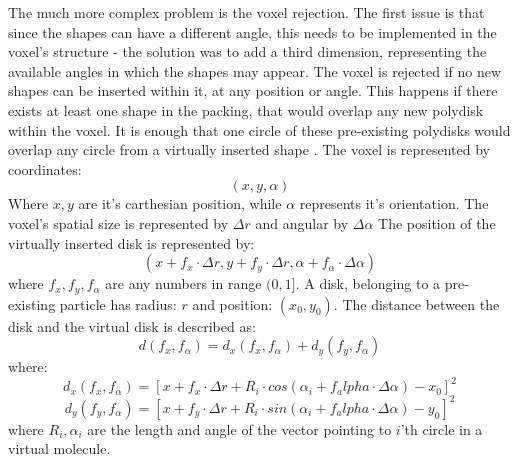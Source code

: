\documentclass[12pt, oneside]{report}
\begin{document}
The much more complex problem is the voxel rejection. The first issue is that since the shapes can have a different angle, this needs to be implemented in the voxel's structure - the solution was to add a third dimension, representing the available angles in which the shapes may appear. \newline \newline
The voxel is rejected if no new shapes can be inserted within it, at any position or angle. This happens if there exists at least one shape in the packing, that would overlap any new polydisk within the voxel. It is enough that one circle of these pre-existing polydisks would overlap any circle from a virtually inserted shape \cite{ciesla}. \newline \newline
The voxel is represented by coordinates:
\begin{equation*}
(x,y,\alpha)
\end{equation*}
Where $x,y$ are it's carthesian position, while $\alpha$ represents it's orientation. \newline
The voxel's spatial size is represented by $\Delta r$ and angular by $\Delta \alpha$ \newline
The position of the virtually inserted disk is represented by:
\begin{equation*}
(x+f_x \cdot \Delta r, y + f_y \cdot \Delta r, \alpha + f_{\alpha} \cdot \Delta \alpha)
\end{equation*}
where $f_x,f_y,f_{\alpha}$ are any numbers in range $(0,1]$. \newline
A disk, belonging to a pre-existing particle has radius: $r$ and position: $(x_0,y_0)$. The distance between the disk and the virtual disk is described as: \newline
\begin{equation*}
d(f_x,f_{\alpha})=d_x(f_x,f_{\alpha})+d_y(f_y,f_{\alpha})
\end{equation*}
where: \newline
\begin{equation*}
d_x(f_x,f_{\alpha})=[x+f_x \cdot \Delta r + R_i \cdot cos(\alpha_i+f_alpha \cdot \Delta \alpha)-x_0]^2
\end{equation*}
\begin{equation*}
d_y(f_y,f_{\alpha})=[x+f_y \cdot \Delta r + R_i \cdot sin(\alpha_i+f_alpha \cdot \Delta \alpha)-y_0]^2
\end{equation*}
where $R_i, \alpha_i$ are the length and angle of the vector pointing to $i$'th circle in a virtual molecule. \newline
\end{document}
